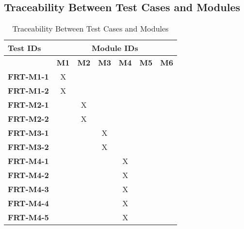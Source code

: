 \documentclass[12pt, titlepage]{article}
\begin{document}
\subsection{Traceability Between Test Cases and Modules}
\newpage
\begin{longtable}{|l|cccccc|}
	\caption{Traceability Between Test Cases and Modules}                                                                                             \\
	\hline
	\textbf{Test IDs}  & \multicolumn{6}{c|}{\textbf{Module IDs}}                                                                                     \\
	\hline
	~                  & \textbf{M1}                              & \textbf{M2} & \textbf{M3} & \textbf{M4} & \textbf{M5} & \textbf{M6} \\
	\hline
	\textbf{FRT-M1-1}  & X                                        & ~           & ~           & ~           & ~ & ~ \\
	\textbf{FRT-M1-2}  & X                                        & ~           & ~           & ~           & ~ & ~ \\
	\textbf{FRT-M2-1}  & ~                                        & X           & ~           & ~           & ~  & ~ \\
	\textbf{FRT-M2-2}  & ~                                        & X           & ~           & ~           & ~   & ~\\
	\textbf{FRT-M3-1}  & ~                                        & ~           & X           & ~           & ~   & ~\\
	\textbf{FRT-M3-2}  & ~                                        & ~           & X           & ~           & ~  & ~ \\
    \textbf{FRT-M4-1}  & ~                                        & ~           & ~           & X           & ~   & ~\\
	\textbf{FRT-M4-2}  & ~                                        & ~           & ~           & X           & ~   & ~\\
	\textbf{FRT-M4-3}  & ~                                        & ~           & ~           & X           & ~   & ~\\
	\textbf{FRT-M4-4}  & ~                                        & ~           & ~           & X           & ~   & ~\\
	\textbf{FRT-M4-5}  & ~                                        & ~           & ~           & X           & ~   & ~\\

\end{longtable}
\end{document}
